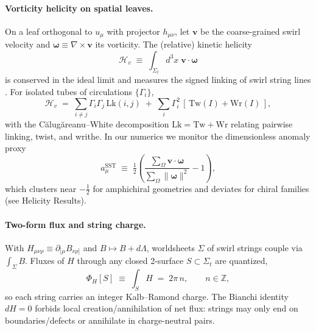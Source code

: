 \documentclass[smallextended]{svjour3}       %
\begin{document}
	\paragraph{Vorticity helicity on spatial leaves.}
	On a leaf orthogonal to \(u_\mu\) with projector \(h_{\mu\nu}\), let \(\mathbf{v}\) be the coarse-grained swirl velocity and \(\boldsymbol{\omega}\equiv\nabla\times\mathbf{v}\) its vorticity. The (relative) kinetic helicity
	\begin{equation}
		\mathcal{H}_{\!v} \;\equiv\; \int_{\Sigma_t} d^3x\; \mathbf{v}\cdot\boldsymbol{\omega}
	\end{equation}
	is conserved in the ideal limit and measures the signed linking of swirl string lines \cite{Moffatt1969,Arnold1998}.
	For isolated tubes of circulations \(\{\Gamma_i\}\),
	\begin{equation}
		\mathcal{H}_{\!v} \;=\; \sum_{i\neq j} \Gamma_i\Gamma_j\,\mathrm{Lk}(i,j)\;+\;\sum_i \Gamma_i^2\,[\,\mathrm{Tw}(I)+\mathrm{Wr}(I)\,],
		\label{eq:calug}
	\end{equation}
	with the Călugăreanu--White decomposition \(\mathrm{Lk}=\mathrm{Tw}+\mathrm{Wr}\) relating pairwise linking, twist, and writhe. In our numerics we monitor the dimensionless anomaly proxy
	\begin{equation}
		a_\mu^{\mathrm{SST}} \;\equiv\; \tfrac12\!\left(\frac{\sum_{\Omega}\mathbf{v}\!\cdot\!\boldsymbol{\omega}}{\sum_{\Omega}\|\boldsymbol{\omega}\|^2}-1\right),
	\end{equation}
	which clusters near \(-\tfrac12\) for amphichiral geometries and deviates for chiral families (see Helicity Results).

	\paragraph{Two-form flux and string charge.}
	With \(H_{\mu\nu\rho}\equiv\partial_{[\mu}B_{\nu\rho]}\) and \(B\mapsto B+d\Lambda\),
	worldsheets \(\Sigma\) of swirl strings couple via \(\int_\Sigma B\).
	Fluxes of \(H\) through any closed 2-surface \(S\subset\Sigma_t\) are quantized,
	\begin{equation}
		\Phi_H[S] \;\equiv\;  \int_S H \;=\; 2\pi\,n,\qquad n\in\mathbb{Z},
	\end{equation}
	so each string carries an integer Kalb--Ramond charge. The Bianchi identity \(dH=0\) forbids local creation/annihilation of net flux: strings may only end on boundaries/defects or annihilate in charge-neutral pairs.
\end{document}
